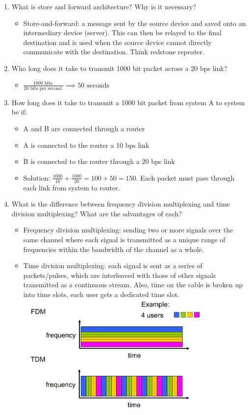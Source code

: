 \documentclass{article}
\begin{document}
\begin{enumerate}
\item What is store and forward architecture? Why is it necessary?
\begin{itemize}
\item Store-and-forward: a message sent by the source device and saved onto an intermediary device (server). This can then be relayed to the final destination and is used when the source device cannot directly communicate with the destination. Think redstone repeater.
\end{itemize}

\item Who long does it take to transmit 1000 bit packet across a 20 bps link?
\begin{itemize}
\item $\frac{1000 \text{ bits }}{20 \text{ bits per second }} \implies 50 \text{ seconds}$
\end{itemize}

\item How long does it take to transmit a 1000 bit packet from system A to system be if:
\begin{itemize}
\item A and B are connected through a router
\item A is connected to the router a 10 bps link
\item B is connected to the router through a 20 bps link
\item Solution: $\frac{1000}{10} + \frac{1000}{20} = 100 + 50 = 150$. Each packet must pass through each link from system to router.
\end{itemize}

\newpage
\item What is the difference between frequency division multiplexing and time division multiplexing? What are the advantages of each?
\begin{itemize}
\item Frequency division multiplexing: sending two or more signals over the same channel where each signal is transmitted as a unique range of frequencies within the bandwidth of the channel as a whole.
\item Time division multiplexing: each signal is sent as a series of packets/pulses, which are interleaved with those of other signals transmitted as a continuous stream. Also, time on the cable is broken up into time slots, each user gets a dedicated time slot.
\includegraphics[width=10cm]{FDM_TDM}
\end{itemize}

\end{enumerate}
\end{document}
